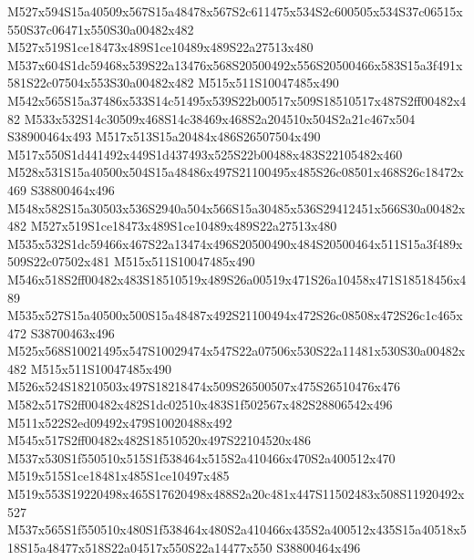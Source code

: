 \documentclass{article}
\begin{document}
\begin{multicols}{2}
M527x594S15a40509x567S15a48478x567S2c611475x534S2c600505x534S37c06515x550S37c06471x550S30a00482x482 M527x519S1ce18473x489S1ce10489x489S22a27513x480 M537x604S1dc59468x539S22a13476x568S20500492x556S20500466x583S15a3f491x581S22c07504x553S30a00482x482 M515x511S10047485x490 M542x565S15a37486x533S14c51495x539S22b00517x509S18510517x487S2ff00482x482 M533x532S14c30509x468S14c38469x468S2a204510x504S2a21c467x504 S38900464x493 M517x513S15a20484x486S26507504x490 M517x550S1d441492x449S1d437493x525S22b00488x483S22105482x460 M528x531S15a40500x504S15a48486x497S21100495x485S26c08501x468S26c18472x469 S38800464x496 M548x582S15a30503x536S2940a504x566S15a30485x536S29412451x566S30a00482x482 M527x519S1ce18473x489S1ce10489x489S22a27513x480 M535x532S1dc59466x467S22a13474x496S20500490x484S20500464x511S15a3f489x509S22c07502x481 M515x511S10047485x490 M546x518S2ff00482x483S18510519x489S26a00519x471S26a10458x471S18518456x489 M535x527S15a40500x500S15a48487x492S21100494x472S26c08508x472S26c1c465x472 S38700463x496 M525x568S10021495x547S10029474x547S22a07506x530S22a11481x530S30a00482x482 M515x511S10047485x490 M526x524S18210503x497S18218474x509S26500507x475S26510476x476 M582x517S2ff00482x482S1dc02510x483S1f502567x482S28806542x496 M511x522S2ed09492x479S10020488x492 M545x517S2ff00482x482S18510520x497S22104520x486 M537x530S1f550510x515S1f538464x515S2a410466x470S2a400512x470 M519x515S1ce18481x485S1ce10497x485 M519x553S19220498x465S17620498x488S2a20c481x447S11502483x508S11920492x527 M537x565S1f550510x480S1f538464x480S2a410466x435S2a400512x435S15a40518x518S15a48477x518S22a04517x550S22a14477x550 S38800464x496


\end{multicols}
\end{document}
